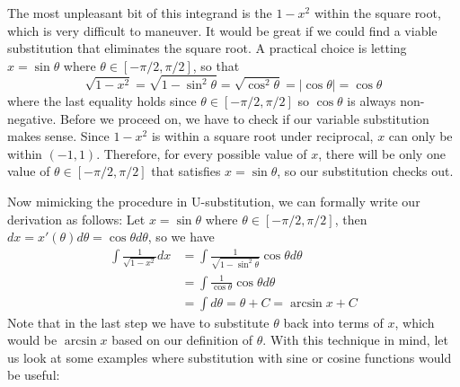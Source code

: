 The most unpleasant bit of this integrand is the $1-x^2$ within the square root, which is very difficult to maneuver.  It would be great if we could find a viable substitution that eliminates the square root.  A practical choice is letting $x = \sin \theta$ where $\theta \in [-\pi/2, \pi/2]$, so that
\[\sqrt{1-x^2} = \sqrt{1-\sin^2 \theta} = \sqrt{\cos^2 \theta} = |\cos \theta| = \cos \theta\]
where the last equality holds since $\theta \in [-\pi/2, \pi/2]$ so $\cos \theta$ is always non-negative.  Before we proceed on, we have to check if our variable substitution makes sense.  Since $1-x^2$ is within a square root under reciprocal, $x$ can only be within $(-1, 1)$.  Therefore, for every possible value of $x$, there will be only one value of $\theta \in [-\pi/2, \pi/2]$ that satisfies $x = \sin \theta$, so our substitution checks out.

Now mimicking the procedure in U-substitution, we can formally write our derivation as follows: Let $x = \sin \theta$ where $\theta \in [-\pi/2, \pi/2]$, then $dx = x'(\theta) d\theta = \cos \theta d\theta$, so we have
\begin{align*}
    \int \frac{1}{\sqrt{1-x^2}}dx &= \int \frac{1}{\sqrt{1-\sin^2 \theta}} \cos\theta d\theta\\
    &= \int \frac{1}{\cos \theta} \cos \theta d\theta \\
    &= \int d\theta = \theta + C = \arcsin x + C
\end{align*}
Note that in the last step we have to substitute $\theta$ back into terms of $x$, which would be $\arcsin x$ based on our definition of $\theta$.  With this technique in mind, let us look at some examples where substitution with sine or cosine functions would be useful:

